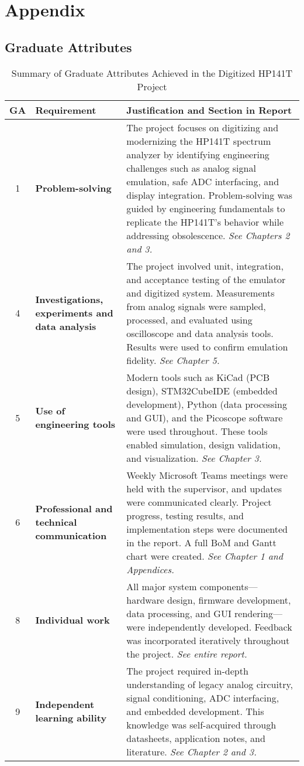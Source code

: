 \documentclass[class=report,11pt,crop=false]{standalone}
\begin{document}
	\chapter{Appendix}

	\section{Graduate Attributes}
		
	\begin{table}[ht!]
		\centering
		\begin{tabular}{|c|m{15em}|m{20em}|}
			\hline
			\textbf{GA} & \textbf{Requirement} & \textbf{Justification and Section in Report} \\
			\hline
			1 & \textbf{Problem-solving} &
			The project focuses on digitizing and modernizing the HP141T spectrum analyzer by identifying engineering challenges such as analog signal emulation, safe ADC interfacing, and display integration. Problem-solving was guided by engineering fundamentals to replicate the HP141T's behavior while addressing obsolescence. \textit{See Chapters 2 and 3.} \\
			\hline
			4 & \textbf{Investigations, experiments and data analysis} &
			The project involved unit, integration, and acceptance testing of the emulator and digitized system. Measurements from analog signals were sampled, processed, and evaluated using oscilloscope and data analysis tools. Results were used to confirm emulation fidelity. \textit{See Chapter 5.} \\
			\hline
			5 & \textbf{Use of engineering tools} &
			Modern tools such as KiCad (PCB design), STM32CubeIDE (embedded development), Python (data processing and GUI), and the Picoscope software were used throughout. These tools enabled simulation, design validation, and visualization. \textit{See Chapter 3.} \\
			\hline
			6 & \textbf{Professional and technical communication} &
			Weekly Microsoft Teams meetings were held with the supervisor, and updates were communicated clearly. Project progress, testing results, and implementation steps were documented in the report. A full BoM and Gantt chart were created. \textit{See Chapter 1 and Appendices.} \\
			\hline
			8 & \textbf{Individual work} &
			All major system components—hardware design, firmware development, data processing, and GUI rendering—were independently developed. Feedback was incorporated iteratively throughout the project. \textit{See entire report.} \\
			\hline
			9 & \textbf{Independent learning ability} &
			The project required in-depth understanding of legacy analog circuitry, signal conditioning, ADC interfacing, and embedded development. This knowledge was self-acquired through datasheets, application notes, and literature. \textit{See Chapter 2 and 3.} \\
			\hline
		\end{tabular}
		\caption{Summary of Graduate Attributes Achieved in the Digitized HP141T Project}
		\label{tab:graduate-attributes-hp141t}
	\end{table}
	
	
	\ifstandalone
	
	\printnoidxglossary[type=\acronymtype,nonumberlist]
	\fi
\end{document}
